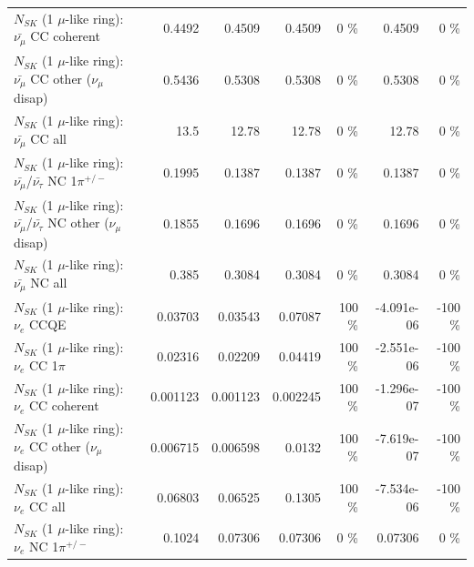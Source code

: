 \begin{table}
\begin{tabular}{| l | r | r | r  r | r  r |}
                       $N_{SK}$ (1 $\mu$-like ring): $\bar{\nu_\mu}$ CC coherent &          0.4492 &          0.4509 &          0.4509 &        0 \%  &          0.4509 &        0 \%  \\ 
        $N_{SK}$ (1 $\mu$-like ring): $\bar{\nu_\mu}$ CC other ($\nu_\mu$ disap) &          0.5436 &          0.5308 &          0.5308 &        0 \%  &          0.5308 &        0 \%  \\ 
                          $N_{SK}$ (1 $\mu$-like ring): $\bar{\nu_{\mu}}$ CC all &            13.5 &           12.78 &           12.78 &        0 \%  &           12.78 &        0 \%  \\ 
\hline
  $N_{SK}$ (1 $\mu$-like ring): $\bar{\nu_\mu}$/$\bar{\nu_\tau}$ NC 1$\pi^{+/-}$ &          0.1995 &          0.1387 &          0.1387 &        0 \%  &          0.1387 &        0 \%  \\ 
$N_{SK}$ (1 $\mu$-like ring): $\bar{\nu_\mu}$/$\bar{\nu_\tau}$ NC other ($\nu_\mu$ disap) &          0.1855 &          0.1696 &          0.1696 &        0 \%  &          0.1696 &        0 \%  \\ 
                          $N_{SK}$ (1 $\mu$-like ring): $\bar{\nu_{\mu}}$ NC all &           0.385 &          0.3084 &          0.3084 &        0 \%  &          0.3084 &        0 \%  \\ 
\hline
\hline
\hline
                                      $N_{SK}$ (1 $\mu$-like ring): $\nu_e$ CCQE &         0.03703 &         0.03543 &         0.07087 &      100 \%  &      -4.091e-06 &     -100 \%  \\ 
                                 $N_{SK}$ (1 $\mu$-like ring): $\nu_e$ CC 1$\pi$ &         0.02316 &         0.02209 &         0.04419 &      100 \%  &      -2.551e-06 &     -100 \%  \\ 
                               $N_{SK}$ (1 $\mu$-like ring): $\nu_e$ CC coherent &        0.001123 &        0.001123 &        0.002245 &      100 \%  &      -1.296e-07 &     -100 \%  \\ 
                $N_{SK}$ (1 $\mu$-like ring): $\nu_e$ CC other ($\nu_\mu$ disap) &        0.006715 &        0.006598 &          0.0132 &      100 \%  &      -7.619e-07 &     -100 \%  \\ 
                                  $N_{SK}$ (1 $\mu$-like ring): $\nu_{e}$ CC all &         0.06803 &         0.06525 &          0.1305 &      100 \%  &      -7.534e-06 &     -100 \%  \\ 
\hline
                           $N_{SK}$ (1 $\mu$-like ring): $\nu_e$ NC 1$\pi^{+/-}$ &          0.1024 &         0.07306 &         0.07306 &        0 \%  &         0.07306 &        0 \%  \\ 

\end{tabular}
\end{table}
